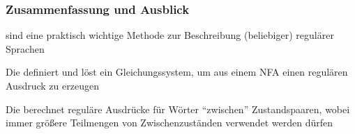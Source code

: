 \documentclass[aspectratio=1610,onlymath]{beamer}
\begin{document}
\begin{frame}\frametitle{Zusammenfassung und Ausblick}

 sind eine praktisch wichtige Methode zur Beschreibung (beliebiger) regulärer Sprachen
\bigskip

Die  definiert und löst ein Gleichungssystem, um aus einem NFA einen regulären Ausdruck zu erzeugen
\bigskip

Die  berechnet reguläre Ausdrücke für Wörter "`zwischen"' Zustandspaaren, wobei immer größere Teilmengen von Zwischenzuständen verwendet werden dürfen
\bigskip


\end{frame}
\end{document}
